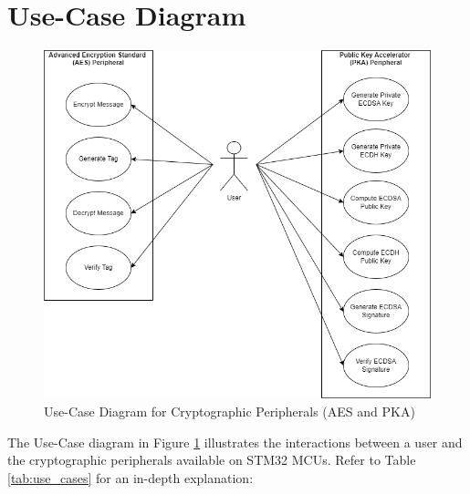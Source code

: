 \section{Use-Case Diagram}
\begin{figure}[H]
  \centering
  \includegraphics[width=14.5cm]{img/use case 2.png}
  \caption{Use-Case Diagram for Cryptographic Peripherals (AES and PKA)}
  \label{fig:use_case_diagram}
\end{figure}

The Use-Case diagram in Figure \ref{fig:use_case_diagram} illustrates the interactions between a user and the cryptographic peripherals available on STM32 MCUs.
 Refer to Table \ref{tab:use_cases} for an in-depth explanation:

